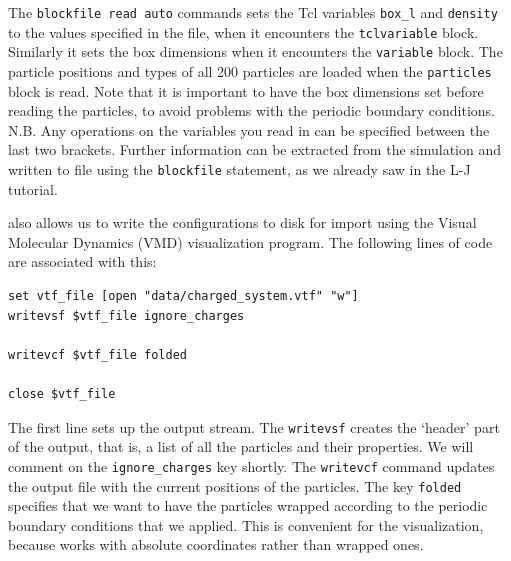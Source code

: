\documentclass[
a4paper,                        %
11pt,                           %
twoside,                        %
footsepline,                    %
headsepline,                    %
headexclude,                    %
footexclude,                    %
pagesize,                       %
]{scrartcl}
\begin{document}
\noindent The \verb|blockfile read auto| commands sets the Tcl variables \verb|box_l| and \verb|density| to the values specified in the file, when it encounters the \verb|tclvariable| block. Similarly it sets the \es{} box dimensions when it encounters the \verb|variable| block. The particle positions and types of all 200 particles are loaded when the \verb|particles| block is read. Note that it is important to have the box dimensions set before reading the particles, to avoid problems with the periodic boundary conditions. N.B. Any operations on the variables you read in can be specified between the last two brackets. Further information can be extracted from the simulation and written to file using the \verb|blockfile| statement, as we already saw in the L-J tutorial.

\es{} also allows us to write the configurations to disk for import using the Visual Molecular Dynamics (VMD) visualization program. The following lines of code are associated with this:

{\small\vspace{0,2cm}
\begin{lstlisting}[numbers=none]
set vtf_file [open "data/charged_system.vtf" "w"]
writevsf $vtf_file ignore_charges

writevcf $vtf_file folded

close $vtf_file
\end{lstlisting}\vspace{0,2cm}
}

\noindent The first line sets up the output stream. The \verb|writevsf| creates the `header' part of the output, that is, a list of all the particles and their properties. We will comment on the \texttt{ignore\_charges} key shortly. The \verb|writevcf| command updates the output file with the current positions of the particles. The key \texttt{folded} specifies that we want to have the particles wrapped according to the periodic boundary conditions that we applied. This is convenient for the visualization, because \es{} works with absolute coordinates rather than wrapped ones. 
\end{document}

